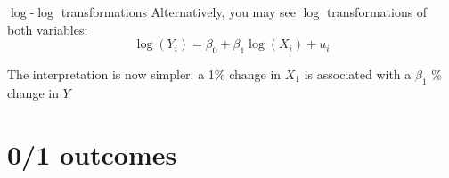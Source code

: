\documentclass[aspectratio=169,t,11pt,table]{beamer}
\begin{document}
\begin{frame}{$\log$-$\log$ transformations}
  Alternatively, you may see $\log$ transformations of both variables:
  $$
    \log(Y_i) = \beta_0 + \beta_1 \log(X_i) + u_i
  $$

  \bigskip
  The interpretation is now simpler: a 1\% change in $X_1$ is associated with a $\beta_1$ \% change in $Y$
\end{frame}

% 





\section{0/1 outcomes}

\end{document}
